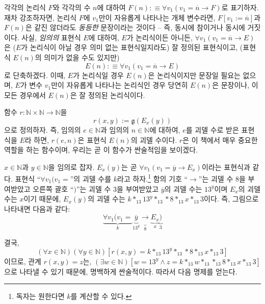 \documentclass[12pt]{paper}
\newcommand{\gnum}{ \mathfrak{g} }
\begin{document}
  각각의 논리식 $F$와 각각의 수 $n$에 대하여 $F \left( n \right) : \equiv \forall v_1 \left( v_1 = \overline{n} \rightarrow F \right)$로 표기하자.
  재차 강조하자면, 논리식 $F$에 $v_1$만이 자유롭게 나타나는 개체 변수라면,
  $F \left[ v_1 := \overline{n} \right]$과 $F \left( n \right)$은 같진 않더라도 \textit{동등한} 문장이라는 것이다 --
  즉, 동시에 참이거나 동시에 거짓이다.
  사실, \textit{임의의} 표현식 $E$에 대하여, $E$가 논리식이든 아니든,
  $\forall v_1 \left( v_1 = \overline{n} \rightarrow E \right)$은 ($E$가 논리식이 아닐 경우 의미 없는 표현식일지라도) 잘 정의된 표현식이고,
  (표현식 $E \left( n \right)$의 의미가 없을 수도 있지만) $$E \left( n \right) : \equiv \forall v_1 \left( v_1 = \overline{n} \rightarrow E \right)$$로 단축하겠다.
  이때, $E$가 논리식일 경우 $E \left( n \right)$은 논리식이지만 문장일 필요는 없으며,
  $E$가 변수 $v_1$만이 자유롭게 나타나는 논리식인 경우 당연히 $E \left( n \right)$은 문장이나,
  이 모든 경우에서 $E \left( n \right)$은 잘 정의된 논리식이다.

  함수 $r : \mathbb{N} \times \mathbb{N} \to \mathbb{N}$을 $$ r \left( x , y \right) := \gnum \left( E_x \left( y \right) \right) $$으로 정의하자.
  즉, 임의의 $e \in \mathbb{N}$과 임의의 $n \in \mathbb{N}$에 대하여,
  $e$를 괴델 수로 받은 표현식을 $E$라 하면, $r \left( e , n \right)$은 표현식 $E \left( n \right)$의 괴델 수이다.
  $r$은 이 책에서 매우 중요한 역할을 하는 함수이며, 우리는 곧 이 함수가 싼술적임을 보이겠다.

  $x \in \mathbb{N}$과 $y \in \mathbb{N}$을 임의로 잡자.
  $E_x \left( y \right)$는 곧 $\forall v_1 \left( v_1 = \overline{y} \rightarrow E_x \right)$이라는 표현식과 같다.
  표현식 ``$ \forall v_1 ( v_1 = $''의 괴델 수를 $k$라고 하자.\footnote
  {
    독자는 원한다면 $k$를 계산할 수 있다.
  }
  함의 기호 ``$\rightarrow$''는 괴델 수 $8$을 부여받았고
  오른쪽 괄호 ``$)$''는 괴델 수 $3$을 부여받았고
  $\overline{y}$의 괴델 수는 $13^{y}$이며 $E_x$의 괴델 수는 $x$이기 때문에,
  $E_x \left( y \right)$의 괴델 수는 $k *_{13} 13^{y} *_{13} * 8 *_{13} x *_{13} 3$이다.
  즉, 그림으로 나타내면 다음과 같다: $$ \underbrace{\forall v_1 ( v_1 =}_{k} \underbrace{\overline{y}}_{13^{y}} \underbrace{\rightarrow}_{8} \underbrace{E_x}_{x} \underbrace{)}_{3}$$

  결국, $$\left( \forall x \in \mathbb{N} \right) \left( \forall y \in \mathbb{N} \right) \left[ r \left( x , y \right) = k *_{13} 13^{y} *_{13} * 8 *_{13} x *_{13} 3 \right]$$이므로,
  관계 $r \left( x , y \right) = z$는, $\left( \exists w \in \mathbb{N} \right) \left[ w = 13^{y} \land z = k *_{13} w *_{13} *_{13} 8 *_{13} x *_{13} 3 \right]$으로 나타낼 수 있기 때문에, 명백하게 싼술적이다.
  따라서 다음 명제를 얻는다.
\end{document}
